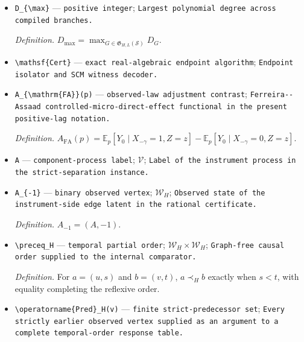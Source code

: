 \documentclass{article}
\begin{document}
\begin{itemize}
  \par\smallskip\noindent\emph{Definition.} \(s_{\max}=\max_{G\in\mathfrak G_{H,L}(\mathcal S)}s_G\).
  \item \texttt{D\_\allowbreak{}\{\textbackslash{}\allowbreak{}max\}\allowbreak{}} --- \texttt{positive integer}; \texttt{Largest polynomial degree across compiled branches.}
  \par\smallskip\noindent\emph{Definition.} \(D_{\max}=\max_{G\in\mathfrak G_{H,L}(\mathcal S)}D_G\).
  \item \texttt{\textbackslash{}\allowbreak{}mathsf\{Cert\}\allowbreak{}} --- \texttt{exact real-\allowbreak{}algebraic endpoint algorithm}; \texttt{Endpoint isolator and SCM witness decoder.}
  \item \texttt{A\_\allowbreak{}\{\textbackslash{}\allowbreak{}mathrm\{FA\}\allowbreak{}\}\allowbreak{}(p)} --- \texttt{observed-\allowbreak{}law adjustment contrast}; \texttt{Ferreira-\allowbreak{}-\allowbreak{}Assaad controlled-\allowbreak{}micro-\allowbreak{}direct-\allowbreak{}effect functional in the present positive-\allowbreak{}lag notation.}
  \par\smallskip\noindent\emph{Definition.} \(A_{\mathrm{FA}}(p)=\mathbb E_p[Y_0\mid X_{-\gamma}=1,Z=z]-\mathbb E_p[Y_0\mid X_{-\gamma}=0,Z=z]\).
  \item \texttt{A} --- \texttt{component-\allowbreak{}process label}; \(\mathcal V\); \texttt{Label of the instrument process in the strict-\allowbreak{}separation instance.}
  \item \texttt{A\_\allowbreak{}\{-\allowbreak{}1\}\allowbreak{}} --- \texttt{binary observed vertex}; \(\mathcal W_H\); \texttt{Observed state of the instrument-\allowbreak{}side edge latent in the rational certificate.}
  \par\smallskip\noindent\emph{Definition.} \(A_{-1}=(A,-1)\).
  \item \texttt{\textbackslash{}\allowbreak{}preceq\_\allowbreak{}H} --- \texttt{temporal partial order}; \(\mathcal W_H\times\mathcal W_H\); \texttt{Graph-\allowbreak{}free causal order supplied to the internal comparator.}
  \par\smallskip\noindent\emph{Definition.} For \(a=(u,s)\) and \(b=(v,t)\), \(a\prec_H b\) exactly when \(s<t\), with equality completing the reflexive order.
  \item \texttt{\textbackslash{}\allowbreak{}operatorname\{Pred\}\allowbreak{}\_\allowbreak{}H(v)} --- \texttt{finite strict-\allowbreak{}predecessor set}; \texttt{Every strictly earlier observed vertex supplied as an argument to a complete temporal-\allowbreak{}order response table.}

\end{itemize}
\end{document}
